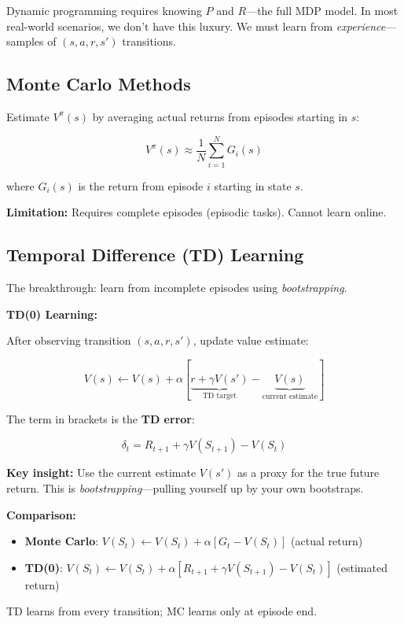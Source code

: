 Dynamic programming requires knowing $P$ and $R$---the full MDP model. In most real-world scenarios, we don't have this luxury. We must learn from \textit{experience}---samples of $(s, a, r, s')$ transitions.

\subsection{Monte Carlo Methods}

\begin{definition}
Estimate $V^\pi(s)$ by averaging actual returns from episodes starting in $s$:

\begin{equation}
    V^\pi(s) \approx \frac{1}{N} \sum_{i=1}^N G_i(s)
\end{equation}

where $G_i(s)$ is the return from episode $i$ starting in state $s$.
\end{definition}

\textbf{Limitation:} Requires complete episodes (episodic tasks). Cannot learn online.

\subsection{Temporal Difference (TD) Learning}

The breakthrough: learn from incomplete episodes using \textit{bootstrapping}.

\begin{seanbox}{5.5}
\textbf{TD(0) Learning:}

After observing transition $(s, a, r, s')$, update value estimate:

\begin{equation}
    V(s) \leftarrow V(s) + \alpha \left[ \underbrace{r + \gamma V(s')}_{\text{TD target}} - \underbrace{V(s)}_{\text{current estimate}} \right]
\end{equation}

The term in brackets is the \textbf{TD error}:

\begin{equation}
    \delta_t = R_{t+1} + \gamma V(S_{t+1}) - V(S_t)
\end{equation}

\textbf{Key insight:} Use the current estimate $V(s')$ as a proxy for the true future return. This is \textit{bootstrapping}---pulling yourself up by your own bootstraps.

\textbf{Comparison:}

\begin{itemize}
    \item \textbf{Monte Carlo}: $V(S_t) \leftarrow V(S_t) + \alpha [G_t - V(S_t)]$ \quad (actual return)
    \item \textbf{TD(0)}: $V(S_t) \leftarrow V(S_t) + \alpha [R_{t+1} + \gamma V(S_{t+1}) - V(S_t)]$ \quad (estimated return)
\end{itemize}

TD learns from every transition; MC learns only at episode end.
\end{seanbox}

